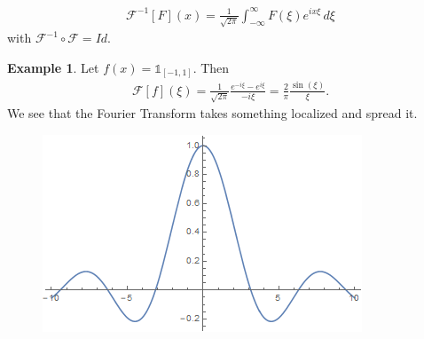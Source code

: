 \documentclass{article}
\theoremstyle{definition}
\newtheorem{exmp}{Example}[section]
\newcommand{\F}{\mathcal{F}}
\begin{document}
\begin{align*}
\F^{-1}[F](x) = \frac{1}{\sqrt{2\pi}}\int^\infty_{-\infty}F(\xi)e^{ix\xi}\,d\xi
\end{align*}
with $\F^{-1}\circ \F = Id$.\\

\begin{exmp}
	Let $f(x) = \mathbb{1}_{[-1,1]}$. Then
	\begin{align*}
	\F[f](\xi) = \frac{1}{\sqrt{2\pi}}\frac{e^{-i\xi} - e^{i\xi}}{-i\xi} = \frac{2}{\pi}\frac{\sin(\xi)}{\xi}.
	\end{align*}
	We see that the Fourier Transform takes something localized and spread it.
	\begin{figure}[h!]
		\centering
		\includegraphics[scale=1]{fourier_1.png}
	\end{figure}
\end{exmp}

$\,$\\
\end{document}
